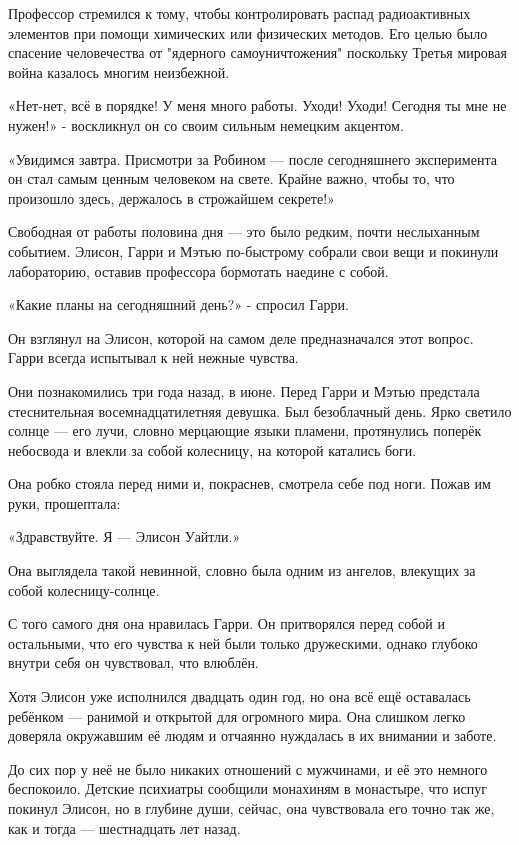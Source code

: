 \documentclass[a5paper, 9pt,
final, openany, twoside=true]{memoir}
\begin{document}
Профессор стремился к тому, чтобы контролировать распад радиоактивных элементов при помощи химических или физических методов. Его целью было спасение человечества от "ядерного самоуничтожения" поскольку Третья мировая война казалось многим неизбежной.\bigskip

«Нет-нет, всё в порядке! У меня много работы. Уходи! Уходи! Сегодня ты мне не нужен!» - воскликнул он со своим сильным немецким акцентом.

«Увидимся завтра. Присмотри за Робином — после сегодняшнего эксперимента он стал самым ценным человеком на свете. Крайне важно, чтобы то, что произошло здесь, держалось в строжайшем секрете!»

Свободная от работы половина дня — это было редким, почти неслыханным событием. Элисон, Гарри и Мэтью по-быстрому собрали свои вещи и покинули лабораторию, оставив профессора бормотать наедине с собой.\bigskip

«Какие планы на сегодняшний день?» - спросил Гарри.

Он взглянул на Элисон, которой на самом деле предназначался этот вопрос. Гарри всегда испытывал к ней нежные чувства.

Они познакомились три года назад, в июне. Перед Гарри и Мэтью предстала стеснительная восемнадцатилетняя девушка. Был безоблачный день. Ярко светило солнце — его лучи, словно мерцающие языки пламени, протянулись поперёк небосвода и влекли за собой колесницу, на которой катались боги.

Она робко стояла перед ними и, покраснев, смотрела себе под ноги. Пожав им руки, прошептала:

«Здравствуйте. Я — Элисон Уайтли.»\bigskip

Она выглядела такой невинной, словно была одним из ангелов, влекущих за собой колесницу-солнце.

С того самого дня она нравилась Гарри. Он притворялся перед собой и остальными, что его чувства к ней были только дружескими, однако глубоко внутри себя он чувствовал, что влюблён.\bigskip

Хотя Элисон уже исполнился двадцать один год, но она всё ещё оставалась ребёнком — ранимой и открытой для огромного мира. Она слишком легко доверяла окружавшим её людям и отчаянно нуждалась в их внимании и заботе.

До сих пор у неё не было никаких отношений с мужчинами, и её это немного беспокоило. Детские психиатры сообщили монахиням в монастыре, что испуг покинул Элисон, но в глубине души, сейчас, она чувствовала его точно так же, как и тогда — шестнадцать лет назад.\bigskip
\end{document}
